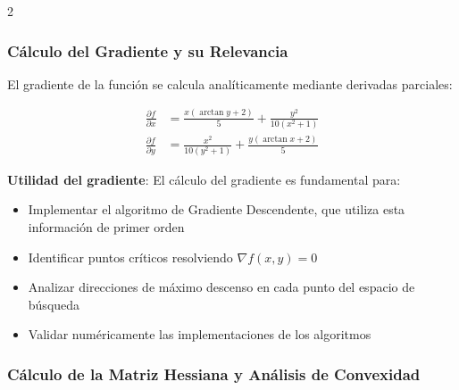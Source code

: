 \documentclass[11pt, a4paper, twocolumn]{beamer}
\begin{document}
	 \begin{multicols}{2}
	 \subsubsection{Cálculo del Gradiente y su Relevancia}
	 
	 El gradiente de la función se calcula analíticamente mediante derivadas parciales:
	 
	 \begin{align*}
	 	\frac{\partial f}{\partial x} &= \frac{x(\arctan y + 2)}{5} + \frac{y^2}{10(x^2 + 1)} \\
	 	\frac{\partial f}{\partial y} &= \frac{x^2}{10(y^2 + 1)} + \frac{y(\arctan x + 2)}{5}
	 \end{align*}
	 
	 \textbf{Utilidad del gradiente}: El cálculo del gradiente es fundamental para:
	 \begin{itemize}
	 	\item Implementar el algoritmo de Gradiente Descendente, que utiliza esta información de primer orden
	 	\item Identificar puntos críticos resolviendo $\nabla f(x,y) = 0$
	 	\item Analizar direcciones de máximo descenso en cada punto del espacio de búsqueda
	 	\item Validar numéricamente las implementaciones de los algoritmos
	 \end{itemize}
 \end{multicols}
 	
 \subsubsection{Cálculo de la Matriz Hessiana y Análisis de Convexidad}
 
\end{document}
